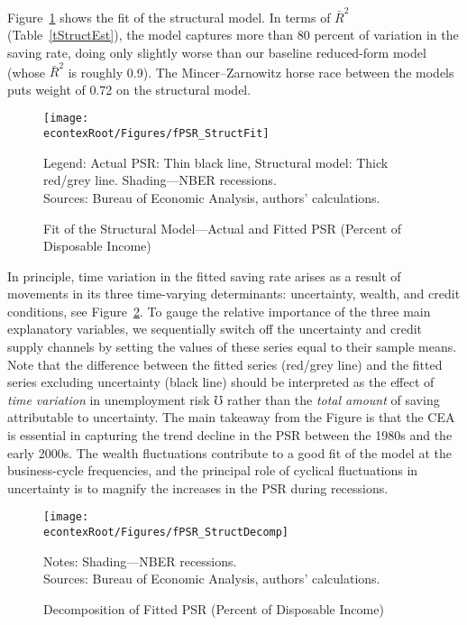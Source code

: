 \documentclass[titlepage]{\econtex}
\begin{document}
Figure~\ref{fPSR_StructFit} shows the fit of the structural model. In terms of $\bar{R}^2$ (Table~\ref{tStructEst}), the model captures more than 80 percent of variation in the saving rate, doing only slightly worse than our baseline reduced-form model (whose $\bar{R}^2$ is roughly 0.9). The Mincer--Zarnowitz horse race between the models puts weight of 0.72 on the structural model. %

\hypertarget{fPSRStructFit}{}
\begin{figure}
\caption{Fit of the Structural Model---Actual and Fitted PSR (Percent of Disposable Income) \label{fPSR_StructFit}}
\texttt{[image: \\econtexRoot/Figures/fPSR\_StructFit]}

\footnotesize
Legend: Actual PSR: Thin black line, Structural model: Thick red/grey line. Shading---NBER recessions.\\[0mm]
\tiny Sources: Bureau of Economic Analysis, authors' calculations.
\end{figure}

In principle, time variation in the fitted saving rate arises as a result of movements in its three time-varying determinants: uncertainty, wealth, and credit conditions, see Figure~\ref{fPSR_StructDecomp}. To gauge the relative importance of the three main explanatory variables, we sequentially switch off the uncertainty and credit supply channels by setting the values of these series equal to their sample means. Note that the difference between the fitted series  (red/grey line) and the fitted series excluding uncertainty (black line) should be interpreted as the effect of \emph{time variation} in unemployment risk $\mho$ rather than the \emph{total amount} of saving attributable to uncertainty. The main takeaway from the Figure is that the CEA is essential in capturing the trend decline in the PSR between the 1980s and the early 2000s. The wealth fluctuations contribute to a good fit of the model at the business-cycle frequencies, and the principal role of cyclical fluctuations in uncertainty is to magnify the increases in the PSR during recessions.

\hypertarget{fPSRStructDecomp}{}
\begin{figure}
\caption{Decomposition of Fitted PSR  (Percent of Disposable Income) \label{fPSR_StructDecomp}}
\texttt{[image: \\econtexRoot/Figures/fPSR\_StructDecomp]}

\footnotesize
Notes: Shading---NBER recessions.\\[0mm]
\tiny Sources: Bureau of Economic Analysis, authors' calculations.
\end{figure}
\end{document}
